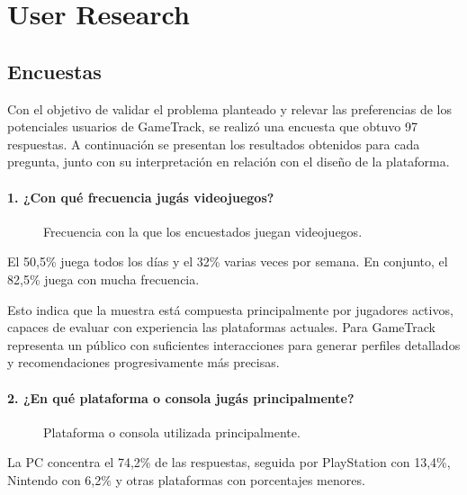 ﻿\chapter{User Research}\label{chapter:user_research}

\section{Encuestas}\label{sec:encuestas}

Con el objetivo de validar el problema planteado y relevar las preferencias de los potenciales usuarios de GameTrack, se realizó una encuesta que obtuvo 97 respuestas. A continuación se presentan los resultados obtenidos para cada pregunta, junto con su interpretación en relación con el diseño de la plataforma.

\subsubsection*{1. ¿Con qué frecuencia jugás videojuegos?}

\begin{figure}[H]
	\centering
	\caption{Frecuencia con la que los encuestados juegan videojuegos.}
	\label{fig:enc-p01}
\end{figure}

El 50,5\% juega todos los días y el 32\% varias veces por semana. En conjunto, el 82,5\% juega con mucha frecuencia.

Esto indica que la muestra está compuesta principalmente por jugadores activos, capaces de evaluar con experiencia las plataformas actuales. Para GameTrack representa un público con suficientes interacciones para generar perfiles detallados y recomendaciones progresivamente más precisas.

\subsubsection*{2. ¿En qué plataforma o consola jugás principalmente?}

\begin{figure}[H]
	\centering
	\caption{Plataforma o consola utilizada principalmente.}
	\label{fig:enc-p02}
\end{figure}

La PC concentra el 74,2\% de las respuestas, seguida por PlayStation con 13,4\%, Nintendo con 6,2\% y otras plataformas con porcentajes menores.

